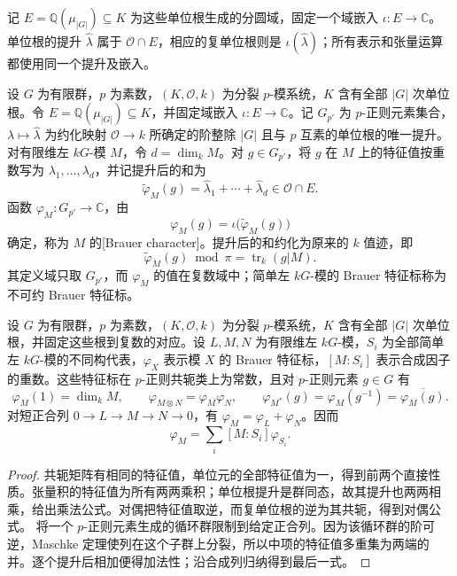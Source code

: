 \ProseParagraphBreak

记 \(E=\mathbb Q(\mu_{|G|})\subseteq K\) 为这些单位根生成的分圆域，固定一个域嵌入 \(\iota:E\to\mathbb C\)。单位根的提升 \(\widehat\lambda\) 属于 \(\mathcal O\cap E\)，相应的复单位根则是 \(\iota(\widehat\lambda)\)；所有表示和张量运算都使用同一个提升及嵌入。
\begin{definition}\label{b5:def:brauer-character}
	设 \(G\) 为有限群，\(p\) 为素数，\((K,\mathcal O,k)\) 为分裂 \(p\)-模系统，\(K\) 含有全部 \(|G|\) 次单位根。令 \(E=\mathbb Q(\mu_{|G|})\subseteq K\)，并固定域嵌入 \(\iota:E\to\mathbb C\)。记 \(G_{p'}\) 为 \(p\)-正则元素集合，\(\lambda\mapsto\widehat\lambda\) 为约化映射 \(\mathcal O\to k\) 所确定的阶整除 \(|G|\) 且与 \(p\) 互素的单位根的唯一提升。对有限维左 \(kG\)-模 \(M\)，令 \(d=\dim_kM\)。对 \(g\in G_{p'}\)，将 \(g\) 在 \(M\) 上的特征值按重数写为 \(\lambda_1,\ldots,\lambda_d\)，并记提升后的和为
	\[
		\widetilde\varphi_M(g)=\widehat\lambda_1+\cdots+\widehat\lambda_d \in\mathcal O\cap E.
	\]
	函数 \(\varphi_M:G_{p'}\to\mathbb C\)，由
	\[
		\varphi_M(g)=\iota\bigl(\widetilde\varphi_M(g)\bigr)
	\]
	确定，称为 \(M\) 的[Brauer character]。提升后的和约化为原来的 \(k\) 值迹，即
	\[
		\widetilde\varphi_M(g)\bmod\pi=\operatorname{tr}_k(g|M).
	\]
	其定义域只取 \(G_{p'}\)，而 \(\varphi_M\) 的值在复数域中；简单左 \(kG\)-模的 Brauer 特征标称为不可约 Brauer 特征标。
\end{definition}
\begin{proposition}\label{b5:prop:brauer-character-properties}
	设 \(G\) 为有限群，\(p\) 为素数，\((K,\mathcal O,k)\) 为分裂 \(p\)-模系统，\(K\) 含有全部 \(|G|\) 次单位根，并固定这些根到复数的对应。设 \(L,M,N\) 为有限维左 \(kG\)-模，\(S_i\) 为全部简单左 \(kG\)-模的不同构代表，\(\varphi_X\) 表示模 \(X\) 的 Brauer 特征标，\([M:S_i]\) 表示合成因子的重数。这些特征标在 \(p\)-正则共轭类上为常数，且对 \(p\)-正则元素 \(g\in G\) 有
	\[
		\varphi_M(1)=\dim_kM,\qquad \varphi_{M\otimes N}=\varphi_M\varphi_N,\qquad \varphi_{M^*}(g)=\varphi_M(g^{-1})=\overline{\varphi_M(g)}.
	\]
	对短正合列 \(0\to L\to M\to N\to0\)，有 \(\varphi_M=\varphi_L+\varphi_N\)。因而
	\[
		\varphi_M=\sum_i[M:S_i]\varphi_{S_i}.
	\]
\end{proposition}
\begin{proof}
	共轭矩阵有相同的特征值，单位元的全部特征值为一，得到前两个直接性质。张量积的特征值为所有两两乘积；单位根提升是群同态，故其提升也两两相乘，给出乘法公式。对偶把特征值取逆，而复单位根的逆为其共轭，得到对偶公式。 将一个 \(p\)-正则元素生成的循环群限制到给定正合列。因为该循环群的阶可逆，Maschke 定理使列在这个子群上分裂，所以中项的特征值多重集为两端的并。逐个提升后相加便得加法性；沿合成列归纳得到最后一式。
\end{proof}

